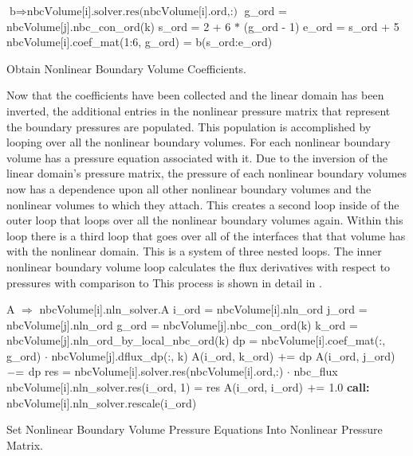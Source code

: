 \begin{algo}[ht!]
\setlength{\baselineskip}{0.625\baselineskip}
\begin{algorithmic}[1]
	\Set $\text{b} \Rightarrow \text{nbcVolume[i].solver.res(nbcVolume[i].ord,:)}$
			\Set g\_ord = nbcVolume[j].nbc\_con\_ord(k)
			\Set s\_ord = 2 + 6 $*$ (g\_ord - 1)
			\Set e\_ord = s\_ord + 5
			\Set nbcVolume[i].coef\_mat(1:6, g\_ord) = b(s\_ord:e\_ord)
		\EndFor
	\EndFor
\EndFor
\end{algorithmic}
\caption{Obtain Nonlinear Boundary Volume Coefficients.}
\label{alg:domDecompGetCoef}
\end{algo}

Now that the coefficients have been collected and the linear domain has been inverted, the additional entries in the nonlinear pressure matrix that represent the boundary pressures are populated.
This population is accomplished by looping over all the nonlinear boundary volumes.
For each nonlinear boundary volume  has a pressure equation associated with it.
Due to the inversion of the linear domain's pressure matrix, the pressure of each nonlinear boundary volumes now has a dependence upon all other nonlinear boundary volumes and the nonlinear volumes to which they attach.
This creates a second loop inside of the outer loop that loops over all the nonlinear boundary volumes again.
Within this loop there is a third loop that goes over all of the interfaces that that volume has with the nonlinear domain.
This is a system of three nested loops.
The inner nonlinear boundary volume loop calculates the flux derivatives with respect to pressures with comparison to 
This process is shown in detail in .

\begin{algo}[ht!]
\setlength{\baselineskip}{0.625\baselineskip}
\begin{algorithmic}[1]
	\Set A $\Rightarrow$ nbcVolume[i].nln\_solver.A
	\Set i\_ord = nbcVolume[i].nln\_ord
		\Set j\_ord = nbcVolume[j].nln\_ord
			\Set g\_ord = nbcVolume[j].nbc\_con\_ord(k)
			\Set k\_ord = nbcVolume[j].nln\_ord\_by\_local\_nbc\_ord(k)
			\Set dp = nbcVolume[i].coef\_mat(:, g\_ord) $\cdot$ nbcVolume[j].dflux\_dp(:, k)
			\Set A(i\_ord, k\_ord) $\mathrel{+}=$ dp
			\Set A(i\_ord, j\_ord) $\mathrel{-}=$ dp
		\EndFor
	\EndFor
	\Set res = nbcVolume[i].solver.res(nbcVolume[i].ord,:) $\cdot$ nbc\_flux
	\Set nbcVolume[i].nln\_solver.res(i\_ord, 1) = res
	\Set A(i\_ord, i\_ord) $\mathrel{+}=$ 1.0
	\State \textbf{call:} nbcVolume[i].nln\_solver.rescale(i\_ord)
\EndFor
\end{algorithmic}
\caption{Set Nonlinear Boundary Volume Pressure Equations Into Nonlinear Pressure Matrix.}
\label{alg:domDecompSetMat}
\end{algo}

